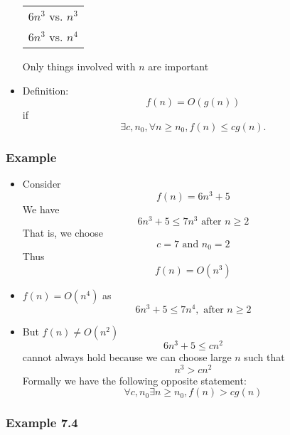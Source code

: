 \begin{frame}[allowframebreaks]
\begin{itemize}
  \begin{center}
    \begin{tabular}{l}
$6n^3$ vs. $n^3$ \\
$6n^3$ vs. $n^4$
    \end{tabular}
\end{center}
Only things involved with $n$ are important
\item Definition:
  \begin{equation*}
  f(n)=O(g(n))
\end{equation*}
if 
  \begin{equation*}
    \exists c, n_0, \forall n \geq n_0,
f(n) \leq c g(n).
  \end{equation*}
\end{itemize}\end{frame} \begin{frame}[allowframebreaks] \frametitle{Example}
    \begin{itemize}
    \item Consider
      \begin{equation*}
      f(n) = 6n^3 + 5
    \end{equation*}
    We have
    \begin{equation*}
6n^3 + 5 \leq 7n^3 \text{ after } n \geq 2
\end{equation*}
That is, we choose 
\begin{equation*}
c=7 \text{ and } n_0 = 2
\end{equation*}
Thus 
\begin{equation*}
f(n) = O(n^3)
\end{equation*}
\item $f(n)=O(n^4)$ as 
  \begin{equation*}
6n^3+5 \leq 7n^4, \text{ after } n \geq 2
\end{equation*}
\item But $f(n) \neq O(n^2)$
  \begin{equation*}
  6n^3+5 \leq c n^2
\end{equation*}
cannot always hold because we can choose large $n$ such that
\begin{equation*}
n^3 > cn^2
\end{equation*}
Formally we have the following opposite statement:
\begin{equation*}
  \forall c, n_0 \exists n \geq n_0, f(n) > c g(n)
\end{equation*}
\end{itemize}\end{frame} \begin{frame}[allowframebreaks] \frametitle{Example 7.4}

\end{frame}
